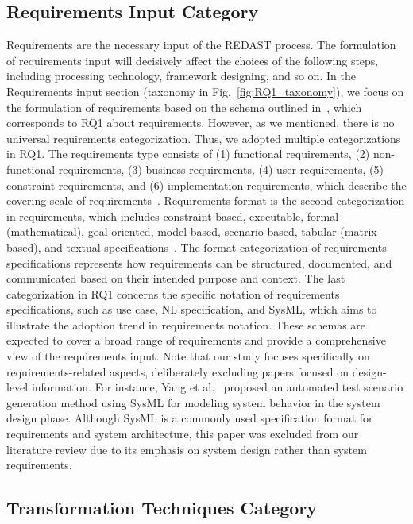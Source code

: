 \subsection{Requirements Input Category}
Requirements are the necessary input of the REDAST process. The formulation of requirements input will decisively affect the choices of the following steps, including processing technology, framework designing, and so on. In the Requirements input section (taxonomy in Fig.~\ref{fig:RQ1_taxonomy}), we focus on the formulation of requirements based on the schema outlined in~\cite{Pohl:11, wagner2019status}, which corresponds to RQ1 about requirements. However, as we mentioned, there is no universal requirements categorization. Thus, we adopted multiple categorizations in RQ1. The requirements type consists of (1)
functional requirements, (2) non-functional requirements, (3) business requirements, (4) user requirements, (5)
constraint requirements, and (6) implementation requirements, which describe the covering scale of requirements~\cite{requirements_terms,requirements_type}. Requirements format is the second categorization in requirements, which includes constraint-based, executable, formal (mathematical), goal-oriented, model-based, scenario-based, tabular (matrix-based), and textual specifications~\cite{scenario_requirements, tabular_requirements, goal_requirements, model_requirements, nl_requirements}. The format categorization of requirements specifications represents how requirements can be structured, documented, and communicated based on their intended purpose and context. The last categorization in RQ1 concerns the specific notation of requirements specifications, such as use case, NL specification, and SysML, which aims to illustrate the adoption trend in requirements notation. These schemas are expected to cover a broad range of requirements and provide a comprehensive view of the requirements input. Note that our study focuses specifically on requirements-related aspects, deliberately excluding papers focused on design-level information. For instance, Yang et al.~\cite{generating2021yang} proposed an automated test scenario generation method using SysML for modeling system behavior in the system design phase. Although SysML is a commonly used specification format for requirements and system architecture, this paper was excluded from our literature review due to its emphasis on system design rather than system requirements.

\subsection{Transformation Techniques Category}

